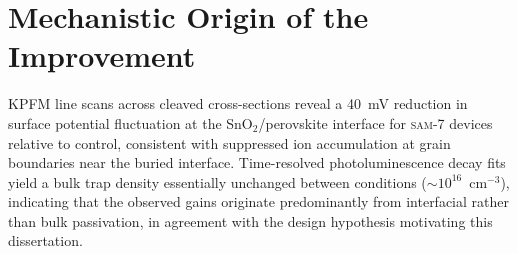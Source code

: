 \section{Mechanistic Origin of the Improvement}

KPFM line scans across cleaved cross-sections reveal a 40~mV reduction in
surface potential fluctuation at the SnO$_2$/perovskite interface for
\textsc{sam-7} devices relative to control, consistent with suppressed
ion accumulation at grain boundaries near the buried interface.
Time-resolved photoluminescence decay fits yield a bulk trap density
essentially unchanged between conditions ($\sim 10^{16}$~cm$^{-3}$),
indicating that the observed gains originate predominantly from
interfacial rather than bulk passivation, in agreement with the design
hypothesis motivating this dissertation.
